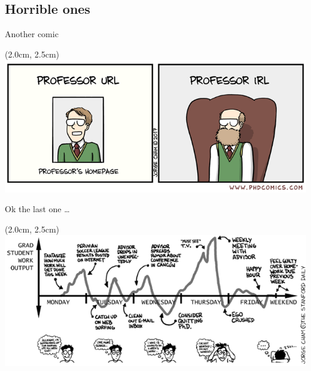 \documentclass[editmode]{EPFL_BEAMER}
\begin{document}
\subsection{Horrible ones}
\begin{frame}{Another comic}
    \begin{textblock*}{13cm}(2.0cm, 2.5cm)
        \includegraphics[width=1.0\textwidth]{phd102221.png}
    \end{textblock*}
\end{frame}

\begin{frame}{Ok the last one \dots}
    \begin{textblock*}{13cm}(2.0cm, 2.5cm)
        \includegraphics[width=1.0\textwidth]{phd050399s.png}
    \end{textblock*}
\end{frame}


\breakingframe{
\begin{textblock*}{10cm}(3.2cm,4cm)
\Huge\textbf{\textcolor{black}{Merci de vo}\textcolor{white}{tre attention}}
\end{textblock*}
}

\cyanbreakingframe{
\begin{textblock*}{10cm}(3.2cm,4cm)
\Huge\textbf{\textcolor{black}{Merci de vo}\textcolor{white}{tre attention}}
\end{textblock*}
}
\end{document}

